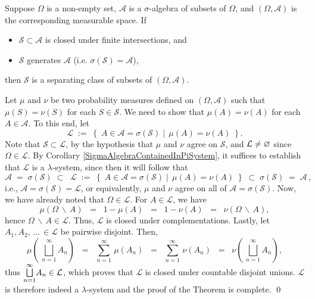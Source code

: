 \begin{theorem}
\mbox{}\vskip 0.1cm
\noindent
Suppose $\Omega$ is a non-empty set, $\mathcal{A}$ is a $\sigma$-algebra of subsets of $\Omega$,
and $(\Omega,\mathcal{A})$ is the corresponding measurable space.
\vskip 0.1cm
\noindent
If
\begin{itemize}
\item	$\mathcal{S} \subset \mathcal{A}$ is closed under finite intersections, and
\item	$\mathcal{S}$ generates $\mathcal{A}$ (i.e. $\sigma(\mathcal{S}) = \mathcal{A}$),
\end{itemize}
then $\mathcal{S}$ is a separating class of subsets of $\left(\Omega,\mathcal{A}\right)$.
\end{theorem}
\proof
Let $\mu$ and $\nu$ be two probability measures defined on $\left(\Omega,\mathcal{A}\right)$
such that $\mu(S) = \nu(S)$ for each $S \in \mathcal{S}$.
We need to show that $\mu(A) = \nu(A)$ for each $A \in \mathcal{A}$.
To this end, let
\begin{equation*}
\mathcal{L}
\; := \;
\left\{\;
A \in \mathcal{A} = \sigma(\mathcal{S})
\;\left\vert\;\,
\mu(A) = \nu(A)
\right.
\;\right\}.
\end{equation*}
Note that $\mathcal{S} \subset \mathcal{L}$, by the hypothesis that $\mu$ and $\nu$ agree on $\mathcal{S}$,
and $\mathcal{L} \neq \varnothing$ since $\Omega \in \mathcal{L}$.
By Corollary \ref{SigmaAlgebraContainedInPiSystem}, it suffices to establish that
$\mathcal{L}$ is a $\lambda$-system, since then it will follow that
\begin{equation*}
\mathcal{A}
\; = \; \sigma(\mathcal{S})
\; \subset \;\; \mathcal{L}
\; := \;
\left\{\;
A \in \mathcal{A} = \sigma(\mathcal{S})
\;\left\vert\;\,
\mu(A) = \nu(A)
\right.
\;\right\}
\; \subset \; \sigma(\mathcal{S}) \; = \; \mathcal{A}\,,
\end{equation*}
i.e., $\mathcal{A} = \sigma(\mathcal{S}) = \mathcal{L}$,
or equivalently, $\mu$ and $\nu$ agree on all of $\mathcal{A} = \sigma(\mathcal{S})$.
Now, we have already noted that $\Omega \in \mathcal{L}$.
For $A \in \mathcal{L}$, we have
\begin{equation*}
\mu(\Omega\,\backslash\,A)
\;\; = \;\; 1 - \mu(A)
\;\; = \;\; 1 - \nu(A)
\;\; = \;\; \nu(\Omega\,\backslash\,A),
\end{equation*}
hence $\Omega\,\backslash\,A \in \mathcal{L}$.
Thus, $\mathcal{L}$ is closed under complementations.
Lastly, let $A_{1}, A_{2},\,\ldots\,\in\mathcal{L}$ be pairwise disjoint.
Then,
\begin{equation*}
\mu\!\left(\,\bigsqcup_{n=1}^{\infty}A_{n}\right)
\;\; = \;\; \sum_{n=1}^{\infty}\,\mu\!\left(A_{n}\right)
\;\; = \;\; \sum_{n=1}^{\infty}\,\nu\!\left(A_{n}\right)
\;\; = \;\; \nu\!\left(\,\bigsqcup_{n=1}^{\infty}A_{n}\right),
\end{equation*}
thus $\underset{n=1}{\overset{\infty}{\textnormal{\large$\bigsqcup$}}}A_{n} \in \mathcal{L}$,
which proves that $\mathcal{L}$ is closed under countable disjoint unions.
$\mathcal{L}$ is therefore indeed a $\lambda$-system and the proof of the Theorem is complete.
\qed

